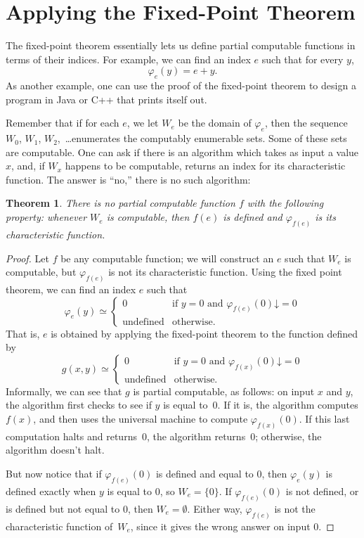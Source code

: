 \documentclass[10pt,a4paper]{article}
\theoremstyle{plain}
\newtheorem{thm}{Theorem}[section]
\theoremstyle{definition}
\theoremstyle{remark}
\newcommand*{\olfileid}[3]{}
\newcommand*{\olsection}[1]{\section*{#1}}
\providecommand{\cfind}[1]{\varphi_{#1}}
\providecommand{\fdefined}{\mathord{\downarrow}}
\begin{document}



\olfileid{cmp}{thy}{apf}
\olsection{Applying the Fixed-Point Theorem}

The fixed-point theorem essentially lets us define partial computable
functions in terms of their indices. For example, we can find an
index $e$ such that for every $y$,
\[
\cfind{e}(y) = e + y.
\]
As another example, one can use the proof of the fixed-point theorem
to design a program in Java or C++ that prints itself out.

Remember that if for each $e$, we let $W_e$ be the domain of $\cfind{e}$,
then the sequence $W_0$, $W_1$, $W_2$,~\dots enumerates the computably
enumerable sets. Some of these sets are computable. One can ask if
there is an algorithm which takes as input a value $x$, and, if $W_x$
happens to be computable, returns an index for its characteristic
function. The answer is ``no,'' there is no such algorithm:

\begin{thm}
There is no partial computable function $f$ with the following
property: whenever $W_e$ is computable, then $f(e)$ is defined and
$\cfind{f(e)}$ is its characteristic function.
\end{thm}

\begin{proof}
Let $f$ be any computable function; we will construct an $e$
such that $W_e$ is computable, but $\cfind{f(e)}$ is not its
characteristic function. Using the fixed point theorem, we can find an
index $e$ such that
\[
\cfind{e}(y) \simeq
\begin{cases}
0 & \text{if $y=0$ and $\cfind{f(e)}(0) \fdefined = 0$} \\
\text{undefined} & \text{otherwise.}
\end{cases}
\]
That is, $e$ is obtained by applying the fixed-point theorem to the
function defined by
\[
g(x,y) \simeq
\begin{cases}
0 & \text{if $y=0$ and $\cfind{f(x)}(0) \fdefined = 0$} \\
\text{undefined} & \text{otherwise.}
\end{cases}
\]
Informally, we can see that $g$ is partial computable, as follows: on
input $x$ and $y$, the algorithm first checks to see if $y$ is equal
to~$0$. If it is, the algorithm computes $f(x)$, and then uses the
universal machine to compute $\cfind{f(x)}(0)$. If this last computation
halts and returns~$0$, the algorithm returns~$0$; otherwise, the
algorithm doesn't halt.

But now notice that if $\cfind{f(e)}(0)$ is defined and equal to $0$,
then $\cfind{e}(y)$ is defined exactly when $y$ is equal to $0$, so $W_e =
\{ 0 \}$. If $\cfind{f(e)}(0)$ is not defined, or is defined but not
equal to $0$, then $W_e = \emptyset$. Either way, $\cfind{f(e)}$ is not
the characteristic function of~$W_e$, since it gives the wrong answer
on input $0$.
\end{proof}
\end{document}
